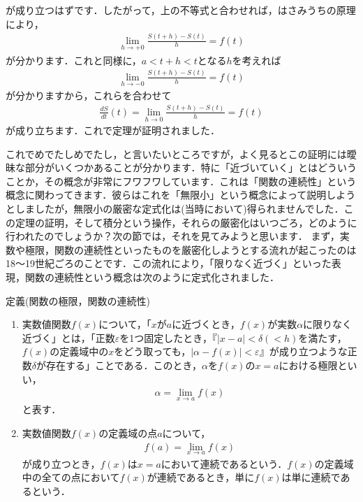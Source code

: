 が成り立つはずです．したがって，上の不等式と合わせれば，はさみうちの原理により，
\begin{eqnarray}
\lim_{h \to +0}\frac{S(t+h)-S(t)}{h} =f(t) \nonumber
\end{eqnarray}
が分かります．これと同様に，$a<t+h<t$となる$h$を考えれば
\begin{eqnarray}
\lim_{h \to -0}\frac{S(t+h)-S(t)}{h} =f(t) \nonumber
\end{eqnarray}
が分かりますから，これらを合わせて
\begin{eqnarray}
\frac{dS}{dt}(t)=\lim_{h \to 0}\frac{S(t+h)-S(t)}{h} =f(t) \nonumber
\end{eqnarray}
が成り立ちます．これで定理が証明されました．
\par これでめでたしめでたし，と言いたいところですが，よく見るとこの証明には曖昧な部分がいくつかあることが分かります．特に「近づいていく」とはどういうことか，その概念が非常にフワフワしています．これは「関数の連続性」という概念に関わってきます．彼らはこれを「無限小」という概念によって説明しようとしましたが，無限小の厳密な定式化は(当時において)得られませんでした．この定理の証明，そして積分という操作，それらの厳密化はいつごろ，どのように行われたのでしょうか？次の節では，それを見てみようと思います．
まず，実数や極限，関数の連続性といったものを厳密化しようとする流れが起こったのは18〜19世紀ごろのことです．この流れにより，「限りなく近づく」といった表現，関数の連続性という概念は次のように定式化されました．
\begin{itembox}[l]{定義(関数の極限，関数の連続性)}
\begin{enumerate}
\item 実数値関数$f(x)$について，「$x$が$a$に近づくとき，$f(x)$が実数$\alpha$に限りなく近づく」とは，「正数$\varepsilon$を1つ固定したとき，『$\left| x-a \right|<\delta(<h)$を満たす，$f(x)$の定義域中の$x$をどう取っても，$\left| \alpha -f(x) \right| <\varepsilon$』が成り立つような正数$\delta$が存在する」ことである．このとき，$\alpha$を$f(x)$の$x=a$における極限といい，
\begin{eqnarray}
\alpha=\lim_{x \to a}f(x) \nonumber
\end{eqnarray}
と表す．
\item 実数値関数$f(x)$の定義域の点$a$について，
\begin{eqnarray}
f(a)=\lim_{x \to a}f(x) \nonumber
\end{eqnarray}
が成り立つとき，$f(x)$は$x=a$において連続であるという．$f(x)$の定義域中の全ての点において$f(x)$が連続であるとき，単に$f(x)$は単に連続であるという．
\end{enumerate}
\end{itembox}
